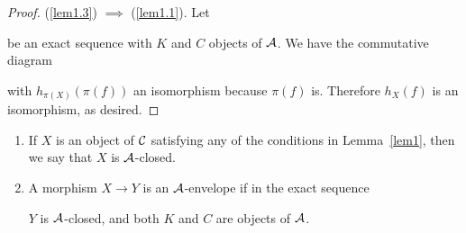\documentclass[dissertation.tex]{subfiles}
\begin{document}
\begin{lem}
\begin{proof}
    (\ref{lem1.3}) $\implies$ (\ref{lem1.1}).  Let
    \begin{center}
    \end{center}
    be an exact sequence with $K$ and $C$ objects of $\mathcal{A}$.
    We have the commutative diagram
    \begin{center}
    \end{center}
    with $h_{\pi(X)}(\pi(f))$ an isomorphism because $\pi(f)$ is.
    Therefore $h_X(f)$ is an isomorphism, as desired.
  \end{proof}
\end{lem}

\begin{defn}
  \begin{enumerate}
  \item
    If $X$ is an object of $\mathcal{C}$ satisfying any of the conditions in Lemma~\ref{lem1}, then we say that $X$ is $\mathcal{A}$-closed.
  \item
    A morphism $X \rightarrow Y$ is an $\mathcal{A}$-envelope if in the exact sequence
    \begin{center}
    \end{center}
    $Y$ is $\mathcal{A}$-closed, and both $K$ and $C$ are objects of $\mathcal{A}$.
  \end{enumerate}
\end{defn}
\end{document}
